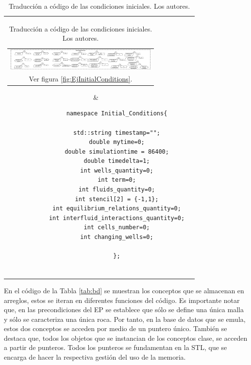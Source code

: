 \begin{table}[h!]
	\centering
	\begin{tabular}{cc}
		\parbox[c]{10em}{
			\begin{tabular}[c]{@{}c@{}}\includegraphics[width=3in]{Fig/EjInitialConditions.pdf}\\ Ver figura \ref{fig:EjInitialConditions}.\end{tabular}
		}
		&
		\begin{tiny}
			\begin{lstlisting}
			namespace Initial_Conditions{
			
			std::string timestamp="";
			double mytime=0;
			double simulationtime = 86400;
			double timedelta=1;
			int wells_quantity=0;
			int term=0;
			int fluids_quantity=0;
			int stencil[2] = {-1,1};
			int equilibrium_relations_quantity=0;
			int interfluid_interactions_quantity=0;
			int cells_number=0;
			int changing_wells=0;
			
			};
			
			\end{lstlisting}
		\end{tiny}
	\end{tabular}
	\caption[Traducción a código de las condiciones iniciales.]{Traducción a código de las condiciones iniciales. Los autores. \label{tab:InitialConditions}}
\end{table}

En el código de la Tabla \ref{tab:bd} se muestran los conceptos que se almacenan en arreglos, estos se iteran en diferentes funciones del código. Es importante notar que, en las precondiciones del EP se establece que sólo se define una única malla y sólo se caracteriza una única roca. Por tanto, en la base de datos que se emula, estos dos conceptos se acceden por medio de un puntero único. También se destaca que, todos los objetos que se instancian de los conceptos clase, se acceden a partir de punteros. Todos los punteros se fundamentan en la STL, que se encarga de hacer la respectiva gestión del uso de la memoria.\\


